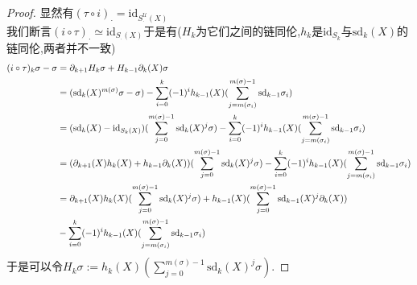 \documentclass{article}
\begin{document}
\begin{proof}
    显然有$(\tau \circ i)_\cdot = \text{id}_{S^\mathcal{U}_\cdot (X)}$\\
    我们断言$(i \circ \tau)_\cdot \simeq \text{id}_{S_\cdot(X)}$于是有($H_k$为它们之间的链同伦,$h_k$是$\text{id}_{S_k}$与$\text{sd}_k(X)$的链同伦,两者并不一致)
    \begin{align}
        (i \circ \tau)_k \sigma - \sigma &= \partial_{k+1}H_k\sigma + H_{k-1}\partial_k(X)\sigma\notag\\
        &=(\text{sd}_{k}(X)^{m(\sigma)}\sigma - \sigma) - \sum_{i = 0}^k (-1)^i h_{k-1}(X)(\sum_{j = m(\sigma_i)}^{m(\sigma)-1}\text{sd}_{k-1}\sigma_i)\notag\\
        &=(\text{sd}_k(X) - \text{id}_{S_k(X)})(\sum_{j = 0}^{m(\sigma)-1}\text{sd}_k(X)^j\sigma)- \sum_{i = 0}^k (-1)^i h_{k-1}(X)(\sum_{j = m(\sigma_i)}^{m(\sigma)-1}\text{sd}_{k-1}\sigma_i)\notag\\
        &= (\partial_{k+1}(X)h_k(X)+h_{k-1}\partial_k(X))(\sum_{j = 0}^{m(\sigma)-1}\text{sd}_k(X)^j\sigma)- \sum_{i = 0}^k (-1)^i h_{k-1}(X)(\sum_{j = m(\sigma_i)}^{m(\sigma)-1}\text{sd}_{k-1}\sigma_i)\notag\\
        &= \partial_{k+1}(X)h_k(X)(\sum_{j = 0}^{m(\sigma)-1}\text{sd}_k(X)^j\sigma)+h_{k-1}(X)(\sum_{j = 0}^{m(\sigma)-1}\text{sd}_{k-1}(X)^j \partial_k(X))\notag\\
        &-\sum_{i = 0}^k (-1)^i h_{k-1}(X)(\sum_{j = m(\sigma_i)}^{m(\sigma)-1}\text{sd}_{k-1}\sigma_i)
    \end{align}
    于是可以令$H_k \sigma := h_k(X)(\sum_{j = 0}^{m(\sigma)-1}\text{sd}_k(X)^j\sigma)$.
\end{proof}
\end{document}
